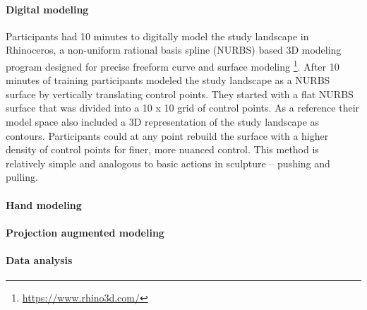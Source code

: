 \documentclass[prodmode,acmtochi]{acmsmall} %
\begin{document}
\paragraph{Digital modeling}
Participants had 10 minutes to digitally model the study landscape in Rhinoceros, 
a non-uniform rational basis spline (NURBS) based 3D modeling program
designed for precise freeform curve and surface modeling 
\footnote{\url{https://www.rhino3d.com/}}. 
%
After 10 minutes of training
participants modeled the study landscape as a NURBS surface 
by vertically translating control points. 
%
They started with a flat NURBS surface that was divided into a 10 x 10 grid of control points.
%
As a reference their model space also included a 3D representation of the study landscape as contours. 
%
Participants could at any point rebuild the surface with a higher density of control points for finer, more nuanced control. 
%
This method is relatively simple and 
analogous to basic actions in sculpture -- pushing and pulling. 







\paragraph{Hand modeling}


\paragraph{Projection augmented modeling}


\paragraph{Data analysis}


\end{document}
